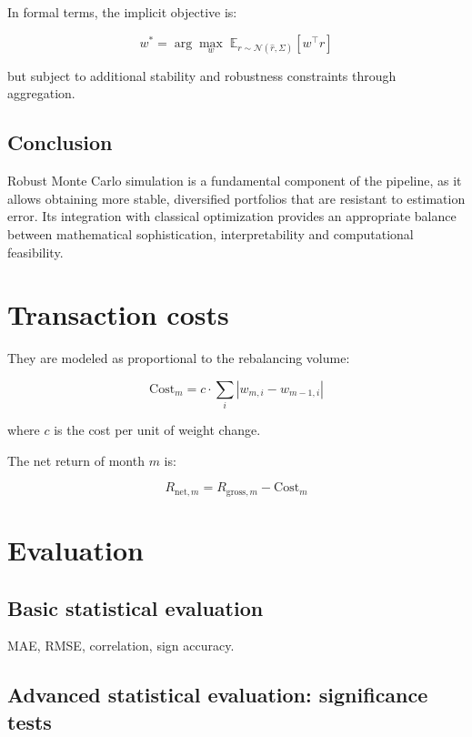 \documentclass[12pt]{article}
\begin{document}
In formal terms, the implicit objective is:



\[
w^\ast = \arg\max_w \; \mathbb{E}_{r \sim \mathcal{N}(\hat{r}, \Sigma)}[w^\top r]
\]



but subject to additional stability and robustness constraints through aggregation.

\subsection{Conclusion}

Robust Monte Carlo simulation is a fundamental component of the pipeline, as it allows obtaining more stable, diversified portfolios that are resistant to estimation error. Its integration with classical optimization provides an appropriate balance between mathematical sophistication, interpretability and computational feasibility.


\section{Transaction costs}

They are modeled as proportional to the rebalancing volume:



\[
\text{Cost}_m = c \cdot \sum_i |w_{m,i} - w_{m-1,i}|
\]



where $c$ is the cost per unit of weight change.

The net return of month $m$ is:



\[
R_{\text{net}, m} = R_{\text{gross}, m} - \text{Cost}_m
\]



\section{Evaluation}

\subsection{Basic statistical evaluation}

MAE, RMSE, correlation, sign accuracy.

\subsection{Advanced statistical evaluation: significance tests}
\end{document}
